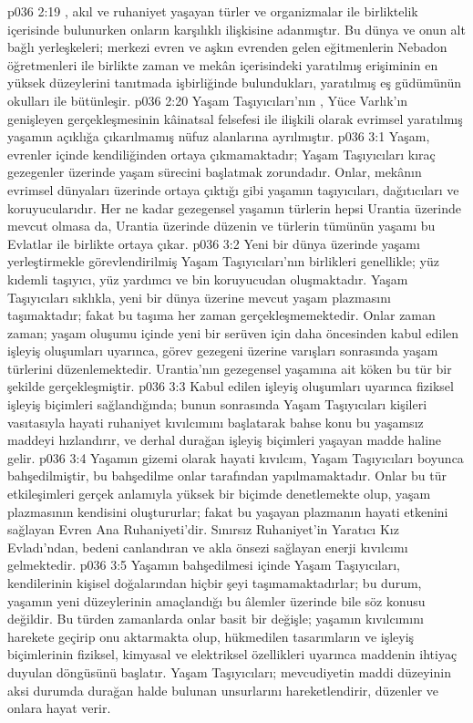 \vs p036 2:19 , akıl ve ruhaniyet yaşayan türler ve organizmalar ile birliktelik içerisinde bulunurken onların karşılıklı ilişkisine adanmıştır. Bu dünya ve onun alt bağlı yerleşkeleri; merkezi evren ve aşkın evrenden gelen eğitmenlerin Nebadon öğretmenleri ile birlikte zaman ve mekân içerisindeki yaratılmış erişiminin en yüksek düzeylerini tanıtmada işbirliğinde bulundukları, yaratılmış eş güdümünün okulları ile bütünleşir.
\vs p036 2:20 Yaşam Taşıyıcıları’nın , Yüce Varlık’ın genişleyen gerçekleşmesinin kâinatsal felsefesi ile ilişkili olarak evrimsel yaratılmış yaşamın açıklığa çıkarılmamış nüfuz alanlarına ayrılmıştır.
\vs p036 3:1 Yaşam, evrenler içinde kendiliğinden ortaya çıkmamaktadır; Yaşam Taşıyıcıları kıraç gezegenler üzerinde yaşam sürecini başlatmak zorundadır. Onlar, mekânın evrimsel dünyaları üzerinde ortaya çıktığı gibi yaşamın taşıyıcıları, dağıtıcıları ve koruyucularıdır. Her ne kadar gezegensel yaşamın türlerin hepsi Urantia üzerinde mevcut olmasa da, Urantia üzerinde düzenin ve türlerin tümünün yaşamı bu Evlatlar ile birlikte ortaya çıkar.
\vs p036 3:2 Yeni bir dünya üzerinde yaşamı yerleştirmekle görevlendirilmiş Yaşam Taşıyıcıları’nın birlikleri genellikle; yüz kıdemli taşıyıcı, yüz yardımcı ve bin koruyucudan oluşmaktadır. Yaşam Taşıyıcıları sıklıkla, yeni bir dünya üzerine mevcut yaşam plazmasını taşımaktadır; fakat bu taşıma her zaman gerçekleşmemektedir. Onlar zaman zaman; yaşam oluşumu içinde yeni bir serüven için daha öncesinden kabul edilen işleyiş oluşumları uyarınca, görev gezegeni üzerine varışları sonrasında yaşam türlerini düzenlemektedir. Urantia’nın gezegensel yaşamına ait köken bu tür bir şekilde gerçekleşmiştir.
\vs p036 3:3 Kabul edilen işleyiş oluşumları uyarınca fiziksel işleyiş biçimleri sağlandığında; bunun sonrasında Yaşam Taşıyıcıları kişileri vasıtasıyla hayati ruhaniyet kıvılcımını başlatarak bahse konu bu yaşamsız maddeyi hızlandırır, ve derhal durağan işleyiş biçimleri yaşayan madde haline gelir.
\vs p036 3:4 Yaşamın gizemi olarak hayati kıvılcım, Yaşam Taşıyıcıları boyunca bahşedilmiştir, bu bahşedilme onlar tarafından yapılmamaktadır. Onlar bu tür etkileşimleri gerçek anlamıyla yüksek bir biçimde denetlemekte olup, yaşam plazmasının kendisini oluştururlar; fakat bu yaşayan plazmanın hayati etkenini sağlayan Evren Ana Ruhaniyeti’dir. Sınırsız Ruhaniyet’in Yaratıcı Kız Evladı’ndan, bedeni canlandıran ve akla önsezi sağlayan enerji kıvılcımı gelmektedir.
\vs p036 3:5 Yaşamın bahşedilmesi içinde Yaşam Taşıyıcıları, kendilerinin kişisel doğalarından hiçbir şeyi taşımamaktadırlar; bu durum, yaşamın yeni düzeylerinin amaçlandığı bu âlemler üzerinde bile söz konusu değildir. Bu türden zamanlarda onlar basit bir değişle; yaşamın kıvılcımını harekete geçirip onu aktarmakta olup, hükmedilen tasarımların ve işleyiş biçimlerinin fiziksel, kimyasal ve elektriksel özellikleri uyarınca maddenin ihtiyaç duyulan döngüsünü başlatır. Yaşam Taşıyıcıları; mevcudiyetin maddi düzeyinin aksi durumda durağan halde bulunan unsurlarını hareketlendirir, düzenler ve onlara hayat verir.
